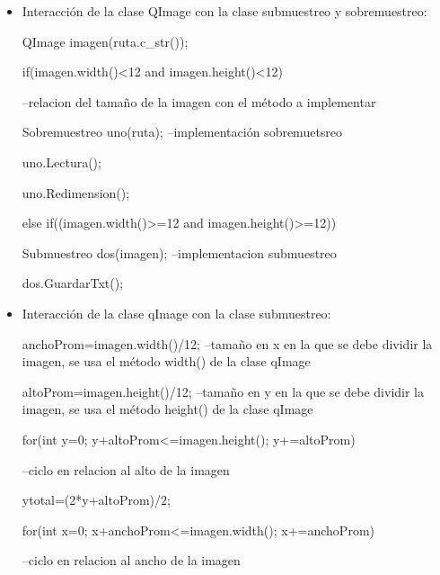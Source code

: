 \documentclass{article}
\begin{document}
\begin{itemize}
\item Interacción de la clase QImage con la clase submuestreo y sobremuestreo:

\hspace{0.5cm}QImage imagen(ruta.c_str());

\hspace{1.5cm}if(imagen.width()<12 and imagen.height()<12){ --relacion del tamaño de la imagen con el método a implementar
    
\hspace{2cm}Sobremuestreo uno(ruta); --implementación sobremuetsreo
        
\hspace{2cm}uno.Lectura();
        
\hspace{2cm}uno.Redimension();
        
\hspace{0.5cm}}
    
\hspace{1.5cm}else if((imagen.width()>=12 and imagen.height()>=12)){
    
\hspace{2cm}Submuestreo dos(imagen); --implementacion submuestreo
        
\hspace{2cm}dos.GuardarTxt();
        
\hspace{1.5cm}}

\item Interacción de la clase qImage con la clase submuestreo:

\hspace{0.5cm}anchoProm=imagen.width()/12; --tamaño en x en la que se debe dividir la imagen, se usa el método width() de la clase qImage

\hspace{0.5cm}altoProm=imagen.height()/12; --tamaño en y en la que se debe dividir la imagen, se usa el método height() de la clase qImage

\hspace{0.5cm}for(int y=0; y+altoProm<=imagen.height(); y+=altoProm){ --ciclo en relacion al alto de la imagen

\hspace{1cm}ytotal=(2*y+altoProm)/2;

\hspace{1cm}for(int x=0; x+anchoProm<=imagen.width(); x+=anchoProm){ --ciclo en relacion al ancho de la imagen

}}
\end{itemize}
\end{document}
